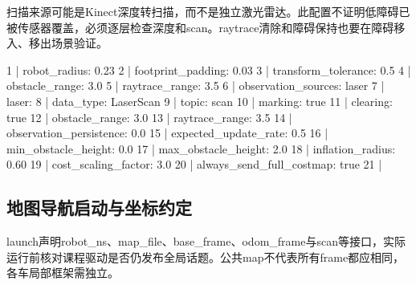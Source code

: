 扫描来源可能是Kinect深度转扫描，而不是独立激光雷达。此配置不证明低障碍已被传感器覆盖，必须逐层检查深度和scan。raytrace清除和障碍保持也要在障碍移入、移出场景验证。
\begin{CodeBlock}
  1 | robot_radius: 0.23
  2 | footprint_padding: 0.03
  3 | transform_tolerance: 0.5
  4 | obstacle_range: 3.0
  5 | raytrace_range: 3.5
  6 | observation_sources: laser
  7 | laser:
  8 |   data_type: LaserScan
  9 |   topic: scan
 10 |   marking: true
 11 |   clearing: true
 12 |   obstacle_range: 3.0
 13 |   raytrace_range: 3.5
 14 |   observation_persistence: 0.0
 15 |   expected_update_rate: 0.5
 16 |   min_obstacle_height: 0.0
 17 |   max_obstacle_height: 2.0
 18 | inflation_radius: 0.60
 19 | cost_scaling_factor: 3.0
 20 | always_send_full_costmap: true
 21 | 
\end{CodeBlock}
\subsection{地图导航启动与坐标约定}
launch声明robot\_ns、map\_file、base\_frame、odom\_frame与scan等接口，实际运行前核对课程驱动是否仍发布全局话题。公共map不代表所有frame都应相同，各车局部框架需独立。

